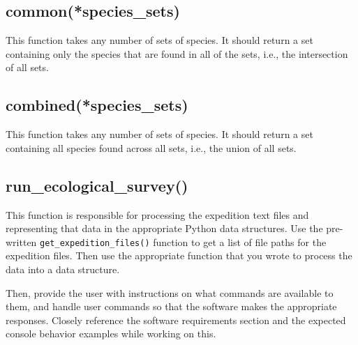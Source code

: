 \documentclass[12pt,letterpaper]{article}
\begin{document}
\subsection{common(*species\_sets)}
This function takes any number of sets of species. It should return a set containing only the species that are found in all of the sets, i.e., the intersection of all sets.

\subsection{combined(*species\_sets)}
This function takes any number of sets of species. It should return a set containing all species found across all sets, i.e., the union of all sets.

\subsection{run\_ecological\_survey()}
This function is responsible for processing the expedition text files and representing that data in the appropriate Python data structures. Use the pre-written \texttt{get\_expedition\_files()} function to get a list of file paths for the expedition files. Then use the appropriate function that you wrote to process the data into a data structure.

Then, provide the user with instructions on what commands are available to them, and handle user commands so that the software makes the appropriate responses. Closely reference the software requirements section and the expected console behavior examples while working on this.
\end{document}
